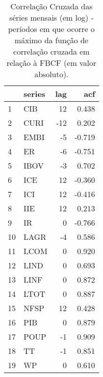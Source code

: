 \begin{table}[!htb]
\centering
\caption{Correla\c{c}\~{a}o Cruzada das s\'{e}ries mensais (em log)
				- per\'{i}odos em que ocorre o m\'{a}ximo da fun\c{c}\~{a}o de correla\c{c}\~{a}o cruzada em rela\c{c}\~{a}o \`{a} FBCF (em valor	absoluto).} 
\label{tab:ccftablem}
\begin{tabular}{llrr}
  \toprule
 & series & lag & acf \\ 
  \midrule
1 & CIB &   12 & 0.438 \\ 
  2 & CURI &  -12 & 0.202 \\ 
  3 & EMBI &   -5 & -0.719 \\ 
  4 & ER &   -6 & -0.751 \\ 
  5 & IBOV &   -3 & 0.702 \\ 
  6 & ICE &   12 & -0.360 \\ 
  7 & ICI &   12 & -0.416 \\ 
  8 & IIE &   12 & 0.213 \\ 
  9 & IR &    0 & -0.766 \\ 
  10 & LAGR &   -4 & 0.586 \\ 
  11 & LCOM &    0 & 0.920 \\ 
  12 & LIND &    0 & 0.693 \\ 
  13 & LINF &    0 & 0.872 \\ 
  14 & LTOT &    0 & 0.887 \\ 
  15 & NFSP &   12 & 0.428 \\ 
  16 & PIB &    0 & 0.879 \\ 
  17 & POUP &   -1 & 0.909 \\ 
  18 & TT &   -1 & 0.851 \\ 
  19 & WP &    0 & 0.610 \\ 
   \bottomrule
\end{tabular}
\end{table}
